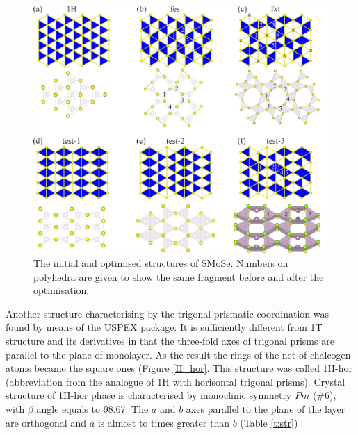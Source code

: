 \documentclass[a4paperm]{article}
\begin{document}
\begin{figure}[H] \centering
        \includegraphics[width=\textwidth]{H-based.png}
        \caption{The initial and optimised structures of SMoSe. Numbers on polyhedra are given to show the same fragment before and after the optimisation.}
\label{H-based}
\end{figure}


Another structure characterising by the trigonal prismatic coordination was found by means of the USPEX package.
It is sufficiently different from 1T structure and its derivatives in that the three-fold axes of trigonal prisms are parallel to the plane of monolayer.
As the result the rings of the net of chalcogen atoms became the square ones (Figure \ref{H_hor}.
This structure was called 1H-hor (abbreviation from the analogue of 1H with horisontal trigonal prisms).
Crystal structure of 1H-hor phase is characterised by monoclinic symmetry $Pm$ (\#6), with $\beta$ angle equals to 98.67\textdegree.
The $a$ and $b$ axes parallel to the plane of the layer are orthogonal and $a$ is almost to times greater than $b$ (Table \ref{t:str})
\end{document}
